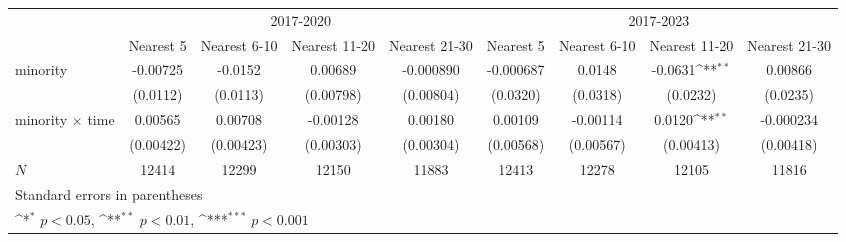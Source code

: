{
\def\sym#1{\ifmmode^{#1}\else\(^{#1}\)\fi}
\begin{tabular}{l*{8}{c}}
\hline\hline
            &\multicolumn{4}{c}{2017-2020}                                                          &\multicolumn{4}{c}{2017-2023}                                                          \\\cmidrule(lr){2-5}\cmidrule(lr){6-9}
            &\multicolumn{1}{c}{Nearest 5}&\multicolumn{1}{c}{Nearest 6-10}&\multicolumn{1}{c}{Nearest 11-20}&\multicolumn{1}{c}{Nearest 21-30}&\multicolumn{1}{c}{Nearest 5}&\multicolumn{1}{c}{Nearest 6-10}&\multicolumn{1}{c}{Nearest 11-20}&\multicolumn{1}{c}{Nearest 21-30}\\
\hline
minority    &    -0.00725         &     -0.0152         &     0.00689         &   -0.000890         &   -0.000687         &      0.0148         &     -0.0631\sym{**} &     0.00866         \\
            &    (0.0112)         &    (0.0113)         &   (0.00798)         &   (0.00804)         &    (0.0320)         &    (0.0318)         &    (0.0232)         &    (0.0235)         \\
[1em]
minority $\times$ time&     0.00565         &     0.00708         &    -0.00128         &     0.00180         &     0.00109         &    -0.00114         &      0.0120\sym{**} &   -0.000234         \\
            &   (0.00422)         &   (0.00423)         &   (0.00303)         &   (0.00304)         &   (0.00568)         &   (0.00567)         &   (0.00413)         &   (0.00418)         \\
\hline
\(N\)       &       12414         &       12299         &       12150         &       11883         &       12413         &       12278         &       12105         &       11816         \\
\hline\hline
\multicolumn{9}{l}{\footnotesize Standard errors in parentheses}\\
\multicolumn{9}{l}{\footnotesize \sym{*} \(p<0.05\), \sym{**} \(p<0.01\), \sym{***} \(p<0.001\)}\\
\end{tabular}
}
